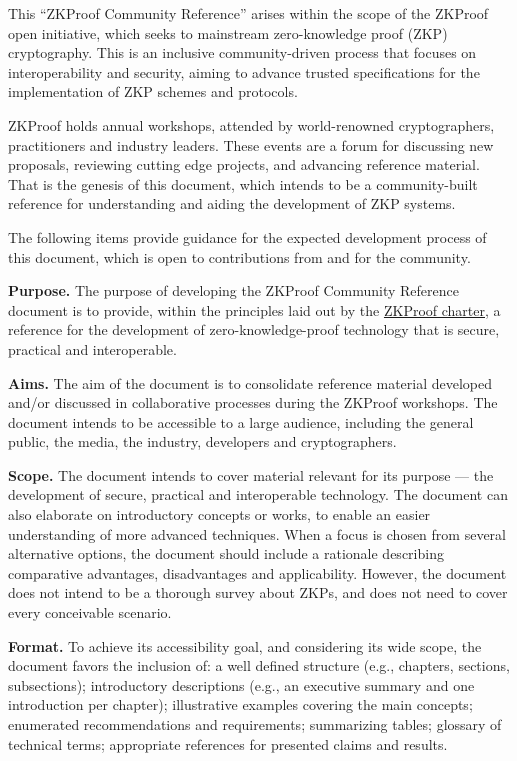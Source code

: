 \label{sec:prelim:about-this-community-reference}

	
	This ``ZKProof Community Reference'' arises within the scope of the ZKProof open initiative, which seeks to mainstream zero-knowledge proof (ZKP) cryptography.
	This is an inclusive community-driven process that focuses on interoperability and security, aiming to advance trusted specifications for the implementation of ZKP schemes and protocols.


	ZKProof holds annual workshops, attended by world-renowned cryptographers, practitioners and industry leaders.
	These events are a forum for discussing new proposals, reviewing cutting edge projects, and advancing reference material.
	That is the genesis of this document, which intends to be a community-built reference for understanding and aiding the development of ZKP systems.


	The following items provide guidance for the expected development process of this document, which is open to contributions from and for the community.



\textbf{Purpose.}
	The purpose of developing the ZKProof Community Reference document is to provide, 
within the principles laid out by the \hyperref[sec:prelim:charter]{ZKProof charter}, 
a reference for the development of zero-knowledge-proof technology that is secure, practical and interoperable.


\textbf{Aims.}
	The aim of the document is to consolidate reference material developed and/or discussed in collaborative processes during the ZKProof workshops. 
	The document intends to be accessible to a large audience, including the general public, the media, the industry, developers and cryptographers.


\textbf{Scope.}
	The document intends to cover material relevant for its purpose --- the development of secure, practical and interoperable technology.
	The document can also elaborate on introductory concepts or works, to enable an easier understanding of more advanced techniques. 
	When a focus is chosen from several alternative options, the document should include a rationale describing comparative advantages, disadvantages and applicability. 
	However, the document does not intend to be a thorough survey about ZKPs, and does not need to cover every conceivable scenario.


\textbf{Format.}
	To achieve its accessibility goal, and considering its wide scope, the document favors the inclusion of: 
	a well defined structure (e.g., chapters, sections, subsections);
	introductory descriptions (e.g., an executive summary and one introduction per chapter); 
	illustrative examples covering the main concepts; 
	enumerated recommendations and requirements; 
	summarizing tables; 
	glossary of technical terms; 
	appropriate references for presented claims and results.


